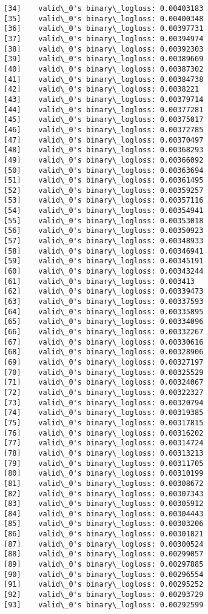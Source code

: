 \documentclass[11pt]{article}
\begin{document}
\begin{Verbatim}[commandchars=\\\{\}]
[34]	valid\_0's binary\_logloss: 0.00403183
[35]	valid\_0's binary\_logloss: 0.00400348
[36]	valid\_0's binary\_logloss: 0.00397731
[37]	valid\_0's binary\_logloss: 0.00394974
[38]	valid\_0's binary\_logloss: 0.00392303
[39]	valid\_0's binary\_logloss: 0.00389669
[40]	valid\_0's binary\_logloss: 0.00387302
[41]	valid\_0's binary\_logloss: 0.00384738
[42]	valid\_0's binary\_logloss: 0.0038221
[43]	valid\_0's binary\_logloss: 0.00379714
[44]	valid\_0's binary\_logloss: 0.00377281
[45]	valid\_0's binary\_logloss: 0.00375017
[46]	valid\_0's binary\_logloss: 0.00372785
[47]	valid\_0's binary\_logloss: 0.00370497
[48]	valid\_0's binary\_logloss: 0.00368293
[49]	valid\_0's binary\_logloss: 0.00366092
[50]	valid\_0's binary\_logloss: 0.00363694
[51]	valid\_0's binary\_logloss: 0.00361495
[52]	valid\_0's binary\_logloss: 0.00359257
[53]	valid\_0's binary\_logloss: 0.00357116
[54]	valid\_0's binary\_logloss: 0.00354941
[55]	valid\_0's binary\_logloss: 0.00353018
[56]	valid\_0's binary\_logloss: 0.00350923
[57]	valid\_0's binary\_logloss: 0.00348933
[58]	valid\_0's binary\_logloss: 0.00346941
[59]	valid\_0's binary\_logloss: 0.00345191
[60]	valid\_0's binary\_logloss: 0.00343244
[61]	valid\_0's binary\_logloss: 0.003413
[62]	valid\_0's binary\_logloss: 0.00339473
[63]	valid\_0's binary\_logloss: 0.00337593
[64]	valid\_0's binary\_logloss: 0.00335895
[65]	valid\_0's binary\_logloss: 0.00334096
[66]	valid\_0's binary\_logloss: 0.00332267
[67]	valid\_0's binary\_logloss: 0.00330616
[68]	valid\_0's binary\_logloss: 0.00328906
[69]	valid\_0's binary\_logloss: 0.00327197
[70]	valid\_0's binary\_logloss: 0.00325529
[71]	valid\_0's binary\_logloss: 0.00324067
[72]	valid\_0's binary\_logloss: 0.00322327
[73]	valid\_0's binary\_logloss: 0.00320794
[74]	valid\_0's binary\_logloss: 0.00319385
[75]	valid\_0's binary\_logloss: 0.00317815
[76]	valid\_0's binary\_logloss: 0.00316202
[77]	valid\_0's binary\_logloss: 0.00314724
[78]	valid\_0's binary\_logloss: 0.00313213
[79]	valid\_0's binary\_logloss: 0.00311705
[80]	valid\_0's binary\_logloss: 0.00310199
[81]	valid\_0's binary\_logloss: 0.00308672
[82]	valid\_0's binary\_logloss: 0.00307343
[83]	valid\_0's binary\_logloss: 0.00305912
[84]	valid\_0's binary\_logloss: 0.00304443
[85]	valid\_0's binary\_logloss: 0.00303206
[86]	valid\_0's binary\_logloss: 0.00301821
[87]	valid\_0's binary\_logloss: 0.00300524
[88]	valid\_0's binary\_logloss: 0.00299057
[89]	valid\_0's binary\_logloss: 0.00297885
[90]	valid\_0's binary\_logloss: 0.00296554
[91]	valid\_0's binary\_logloss: 0.00295252
[92]	valid\_0's binary\_logloss: 0.00293729
[93]	valid\_0's binary\_logloss: 0.00292599

\end{Verbatim}
\end{document}
